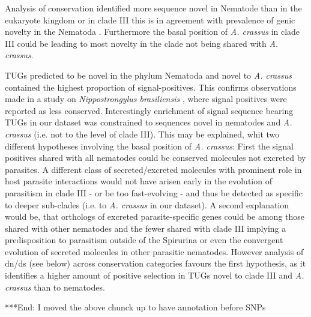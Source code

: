 \documentclass[10pt]{bmc_article}
\newenvironment{bmcformat}{\begin{raggedright}\baselineskip20pt\sloppy\setboolean{publ}{false}}{\end{raggedright}\baselineskip20pt\sloppy}
\begin{document}
\begin{bmcformat}
Analysis of conservation identified more sequence novel in Nematode
than in the eukaryote kingdom or in clade III this is in agreement
with prevalence of genic novelty in the Nematoda
\cite{wasmuth_extent_2008}. Furthermore the basal position of
\textit{A. crassus} in clade III could be leading to most novelty in
the clade not being shared with \textit{A. crassus}.

TUGs predicted to be novel in the phylum Nematoda and novel to
\textit{A. crassus} contained the highest proportion of
signal-positives. This confirms observations made in a study on
\textit{Nippostrongylus brasiliensis} \cite{harcus_signal_2004}, where
signal positives were reported as less conserved. Interestingly
enrichment of signal sequence bearing TUGs in our dataset was
constrained to sequences novel in nematodes and \textit{A. crassus}
(i.e. not to the level of clade III). This may be explained, whit two
different hypotheses involving the basal position of
\textit{A. crassus}: First the signal positives shared with all
nematodes could be conserved molecules not excreted by parasites. A
different class of secreted/excreted molecules with prominent role in
host parasite interactions would not have arisen early in the
evolution of parasitism in clade III - or be too fast-evolving - and
thus be detected as specific to deeper sub-clades (i.e. to
\textit{A. crassus} in our dataset). A second explanation would be,
that orthologs of excreted parasite-specific genes could be among
those shared with other nematodes and the fewer shared with clade III
implying a predisposition to parasitism outside of the Spirurina or
even the convergent evolution of secreted molecules in other parasitic
nematodes. However analysis of dn/ds (see below) across conservation
categories favours the first hypothesis, as it identifies a higher
amount of positive selection in TUGs novel to clade III and
\textit{A. crassus} than to nematodes.

***End: I moved the above chunck up to have annotation before SNPs


\end{bmcformat}
\end{document}
